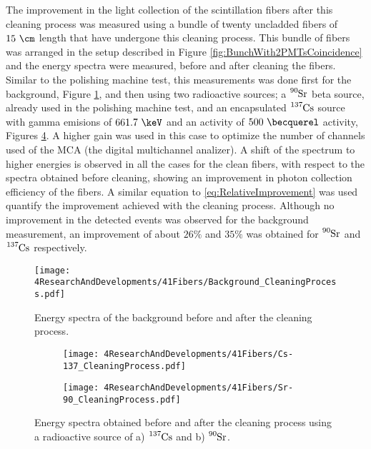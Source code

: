 The improvement in the light collection of the scintillation fibers after this cleaning process was measured using a bundle of twenty uncladded fibers of $15~\cm$ length that have undergone this cleaning process. This bundle of fibers was arranged in the setup described in Figure \ref{fig:BunchWith2PMTsCoincidence} and the energy spectra were measured, before and after cleaning the fibers. Similar to the polishing machine test, this measurements was done first for the background, Figure \ref{fig:ResultsOfCleaningProcessBackground}, and then using two radioactive sources; a $\ce{^{90}Sr}$ beta source, already used in the polishing machine test, and an encapsulated $\ce{^{137}Cs}$ source with gamma emisions of $661.7~\keV$ and an activity of $500~\becquerel$ activity, Figures \ref{fig:ResultsOfCleaningProcessSource}. A higher gain was used in this case to optimize the number of channels used of the MCA (the digital multichannel analizer). A shift of the spectrum to higher energies is observed in all the cases for the clean fibers, with respect to the spectra obtained before cleaning, showing an improvement in photon collection efficiency of the fibers. A similar equation to \ref{eq:RelativeImprovement} was used  quantify the improvement achieved with the cleaning process. Although no improvement in the detected events was observed for the background measurement, an improvement of about $26\%$ and $35\%$ was obtained for $\ce{^{90}Sr}$ and $\ce{^{137}Cs}$ respectively.

\begin{figure}[h]
\centering
\texttt{[image: 4ResearchAndDevelopments/41Fibers/Background\_CleaningProcess.pdf]}
\caption{Energy spectra of the background before and after the cleaning process.\label{fig:ResultsOfCleaningProcessBackground}}
\end{figure}

\begin{figure}
\centering
    \begin{subfigure}[b]{1\textwidth}
    \centering
    \texttt{[image: 4ResearchAndDevelopments/41Fibers/Cs-137\_CleaningProcess.pdf]}  
    \caption{\label{subfig:EnergySpectrumCo60CleaningTest}}
    \end{subfigure}
    \hfill
    \begin{subfigure}[b]{1\textwidth}
    \centering
    \texttt{[image: 4ResearchAndDevelopments/41Fibers/Sr-90\_CleaningProcess.pdf]}  
    \caption{\label{subfig:EnergySpectrumSr90CleaningTest}}
    \end{subfigure}
 \caption{Energy spectra obtained before and after the cleaning process using a radioactive source of a) $\ce{^{137}Cs}$ and b) $\ce{^{90}Sr}$.}
 \label{fig:ResultsOfCleaningProcessSource}
\end{figure}


